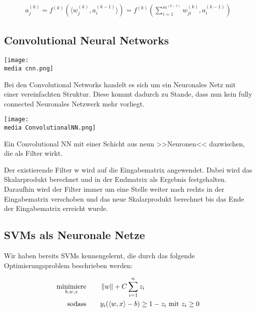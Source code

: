 \begin{align*}
a_j^{(k)} = f^{(k)} (\langle w_{j}^{(k)}, a_i^{(k-1)}\rangle) = f^{(k)} (\sum_{i=1}^{m^{(k-1)}} w_{ji}^{(k)},a_i^{(k-1)} )
\end{align*}

\subsection{Convolutional Neural Networks}

\begin{dsafigure}
	\begin{center}
		\texttt{[image: \\media cnn.png]}
		\caption{Ein Convolutional Neural Network (CNN) (dt.: >>faltendes neurales Netzwerk<<) %
		}
		\label{FigConvNN}
	\end{center}
\end{dsafigure}


Bei den Convolutional Networks handelt es sich um ein Neuronales Netz mit einer vereinfachten Struktur. Diese kommt dadurch zu Stande, dass nun kein fully connected Neuronales Netzwerk mehr vorliegt. 

\begin{dsafigure}
	\begin{center}
		\texttt{[image: \\media ConvolutionalNN.png]}
		\caption{Ein Convolutional NN mit einer Schicht aus neun >>Neuronen<< dazwischen, die als Filter wirkt. }
		\label{FigConvNN}
	\end{center}
\end{dsafigure}

Der existierende Filter {w} wird auf die Eingabematrix angewendet. Dabei wird das Skalarprodukt berechnet und in der Endmatrix als Ergebnis festgehalten. Daraufhin wird der Filter immer um eine Stelle weiter nach rechts in der Eingabematrix verschoben und das neue Skalarprodukt berechnet bis das Ende der Eingabematrix erreicht wurde.

\subsection{SVMs als Neuronale Netze}

Wir haben bereits SVMs kennengelernt, die durch das folgende Optimierungsproblem beschrieben werden:

\begin{align*}
\underset{b,w,z}{\text{minimiere}} &\qquad\left\lVert w\right\rVert + C  \sum_{i=1}^{n} z_i\\
\text{sodass} &\qquad y_i (\langle w,x \rangle - b) \geq 1 - z_i \text { mit } z_i \geq 0
\end{align*}

